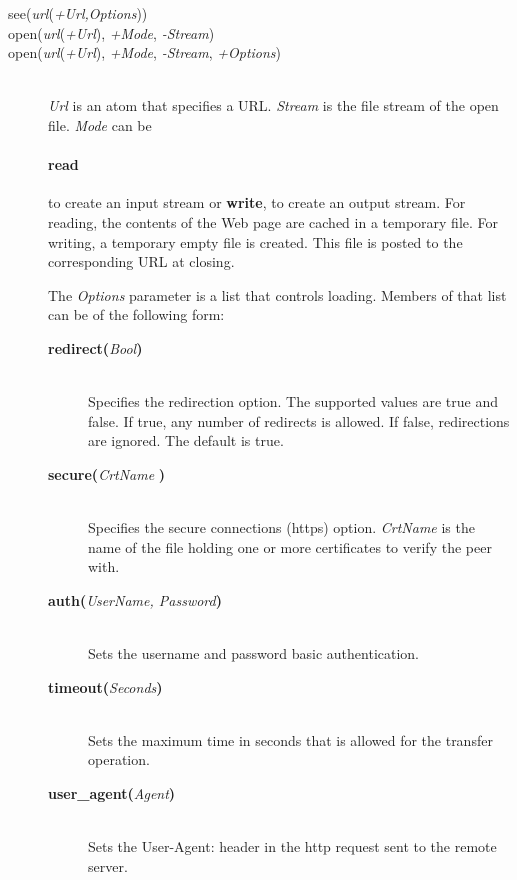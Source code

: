 \begin{description}

\item[see({\it url}({\it +Url,Options}))]\mbox{}
\item[open({\it url}({\it +Url}), {\it +Mode}, {\it -Stream})]\mbox{}
\item[open({\it url}({\it +Url}), {\it +Mode}, {\it -Stream}, {\it +Options})]\mbox{}
  \\

{\it Url} is an atom that specifies a URL.
\emph{Stream} is the file stream of the open file.
{\it Mode} can be
\paragraph{read} to create an input stream or
{\bf write},  to create an output stream.
For reading, the contents of the Web page are cached in a temporary file.
For writing, a temporary empty file is created. This file is posted to the
corresponding URL at closing.

The {\it Options} parameter is a list that controls loading. Members of that list can be of the following form:

  \begin{description}
  \item[{\bf redirect}{\bf (}{\it Bool}{\bf )}]\mbox{}
    \\
    Specifies the redirection option. The supported values are true and
    false. If true, any number of redirects is allowed. If false,
    redirections are ignored.
    The default is true.

  \item[{\bf secure}{\bf (}{\it CrtName}{\bf
    )}]\mbox{}
    \\
    Specifies the secure connections (https) option. \emph{CrtName} is the name of the file holding one or more certificates to verify the peer with. 

  \item[{\bf auth}{\bf (}{\it UserName, \it Password}{\bf )}]\mbox{}\\Sets the username and password basic authentication.

  \item[{\bf timeout}{\bf (}{\it Seconds}{\bf )}]\mbox{}\\Sets the maximum time in seconds that is allowed for the transfer operation.

  \item[{\bf user\_agent}{\bf (}{\it Agent}{\bf )}]\mbox{}\\Sets the User-Agent: header in the http request sent to the remote server.

  \end{description}


\end{description}

